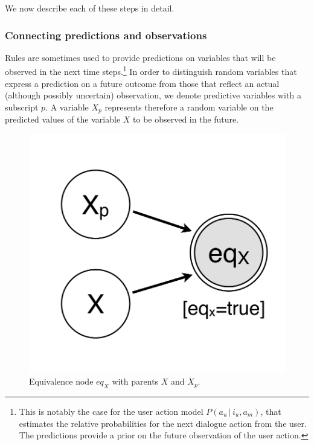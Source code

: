 We now describe each of these steps in detail.


\subsubsection*{Connecting predictions and observations}

Rules are sometimes used to provide predictions on variables that will be observed in the next time steps.\footnote{This is notably the case for the user action model $P(a_u \, | \, i_u, a_m)$, that estimates the relative probabilities for the next dialogue action from the user. The predictions provide a prior on the future observation of the user action.} In order to distinguish random variables that express a prediction on a future outcome from those that reflect an actual (although possibly uncertain) observation, we denote predictive variables with a subscript $p$. A variable $X_p$ represents therefore a random variable on the predicted values of the variable $X$ to be observed in the future. 

\begin{figure}
\vspace{-5mm}
\centering
\includegraphics[scale=0.25]{imgs/prediction.pdf} 
\vspace{-2mm}
\caption{Equivalence node $eq_{X}$ with parents $X$ and $X_p$.}
\label{fig:prediction}
\end{figure}

